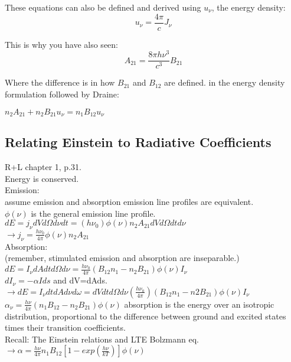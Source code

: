 \documentclass[12pt]{report}
\begin{document}
These equations can also be defined and derived using $u_\nu$, the energy density:
\begin{equation}
u_\nu=\frac{4\pi}{c} J_\nu
\end{equation}

This is why you have also seen:
\begin{equation}
{A_{21}=\frac{8\pi h\nu^3}{c^3}B_{21} }
\end{equation}

Where the difference is in how $B_{21}$ and $B_{12}$ are defined. in the energy density formulation followed by Draine:

 \( n_2A_{21}+n_2B_{21}u_\nu = n_1B_{12}u_\nu  \)


\subsection{Relating Einstein to Radiative Coefficients}\label{sec:einsteinradiative}
R+L chapter 1, p.31.\\
Energy is conserved.\\
Emission:\\
assume emission and absorption emission line profiles are equivalent. \\
$\phi(\nu)$ is the general emission line profile.\\
\( dE=j_\nu dVd\Omega d\nu dt =(h\nu_0)\phi (\nu)n_2A_{21}dVd\Omega dt d\nu \) \\
\(\rightarrow \boxed{j_\nu=\frac{h\nu_0}{4\pi}\phi(\nu)n_2 A_{21} } \) \\
Absorption:\\
(remember, stimulated emission and absorption are inseparable.)\\
\( dE=I _\nu dAdt d\Omega d\nu =\frac{h\nu_0}{4\pi}(B_{12}n_1-n_2B_{21})\phi(\nu)I_\nu \)\\
$dI_\nu=-\alpha I ds$ and dV=dAds.\\
$\rightarrow dE=I_\nu dt dA d\nu d\omega=dVdtd\Omega d\nu(\frac{h\nu_0}{4\pi})(B_{12}n_1-n2B_{21})\phi(\nu)I_\nu$\\
\(\boxed{\alpha_\nu=\frac{h\nu}{4\pi}(n_1B_{12}-n_2B_{21})\phi(\nu) }\)
absorption is the energy over an isotropic distribution, proportional to the difference between ground and excited states times their transition coefficients.\\
Recall: The Einstein relations and LTE Bolzmann eq. \\
\( \rightarrow \alpha= \frac{h\nu}{4\pi}n_1B_{12}[1-exp(\frac{h\nu}{kT})]\phi(\nu)\)
\end{document}
